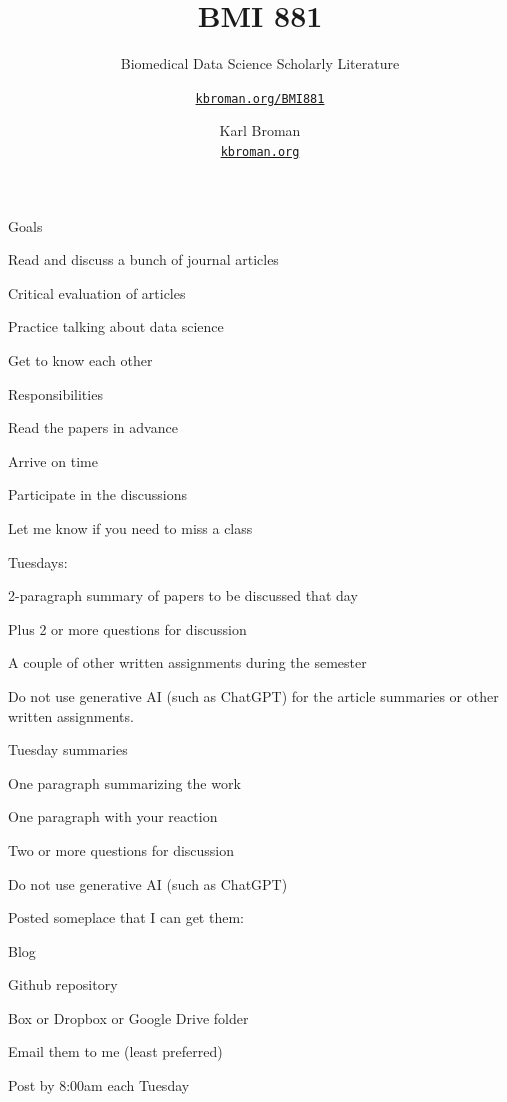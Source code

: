 \documentclass[aspectratio=169,12pt,t]{beamer}
\title{BMI 881}
\subtitle{Biomedical Data Science Scholarly Literature}
\author{\href{https://kbroman.org/BMI881}{\tt kbroman.org/BMI881} }
\institute{}
\date{\small \hspace{3in} Karl Broman \\
  \hspace{3in} \href{https://kbroman.org}{\color{foreground}
    \small \tt kbroman.org}}
\begin{document}
{
\frame{
  \titlepage
} }




\begin{frame}{Goals}

  \bbi
\item Read and discuss a bunch of journal articles
\item Critical evaluation of articles
\item Practice talking about data science
\item Get to know each other
  \ei

\end{frame}














\begin{frame}{Responsibilities}

  \bi
\item Read the papers in advance
\item Arrive on time
\item Participate in the discussions
\item Let me know if you need to miss a class
\item Tuesdays:
  \bi
  \item 2-paragraph summary of papers to be discussed that day
  \item Plus 2 or more questions for discussion
  \ei
\item A couple of other written assignments during the semester
\item Do not use generative AI (such as ChatGPT) for the article
  summaries or other written assignments.
  \ei

\end{frame}



\begin{frame}{Tuesday summaries}

  \bbi
\item One paragraph summarizing the work
\item One paragraph with your reaction
\item Two or more questions for discussion
\item Do not use generative AI (such as ChatGPT)
\item Posted someplace that I can get them:
  \bi
\item Blog
\item Github repository
\item Box or Dropbox or Google Drive folder
\item Email them to me (least preferred)
  \ei
\item Post by 8:00am each Tuesday
\ei

\end{frame}
\end{document}
